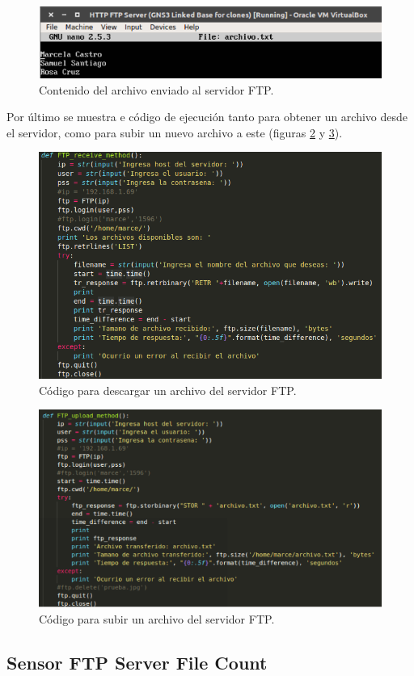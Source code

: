 \FloatBarrier
\begin{figure}[htbp!]
		\centering
			\includegraphics[width=.75 \textwidth]{images/ftp10}
		\caption{Contenido del archivo enviado al servidor FTP.}
		\label{image:ftp10}
\end{figure}
\FloatBarrier
Por último se muestra e código de ejecución tanto para obtener un archivo desde el servidor, como para subir un nuevo archivo a este (figuras \ref{image:ftpc1} y \ref{image:ftpc2}). 
\FloatBarrier
\begin{figure}[htbp!]
		\centering
			\includegraphics[width=.75 \textwidth]{images/ftpc1}
		\caption{Código para descargar un archivo del servidor FTP.}
		\label{image:ftpc1}
\end{figure}
\FloatBarrier
\FloatBarrier
\begin{figure}[htbp!]
		\centering
			\includegraphics[width=.8 \textwidth]{images/ftpc2}
		\caption{Código para subir un archivo del servidor FTP.}
		\label{image:ftpc2}
\end{figure}
\FloatBarrier
\subsection{Sensor FTP Server File Count}
